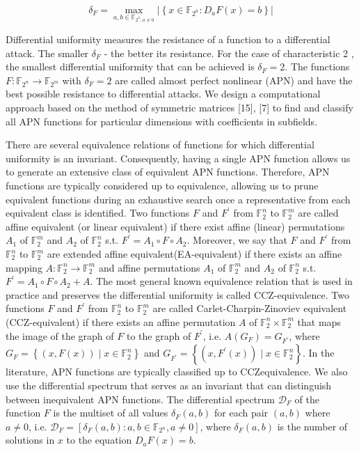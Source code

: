 \documentclass[10pt]{article}
\begin{document}
$$
\delta_{F}=\max _{a, b \in \mathbb{F}_{2^{n}, a \neq 0}}\left|\left\{x \in \mathbb{F}_{2^{n}}: D_{a} F(x)=b\right\}\right|
$$

Differential uniformity measures the resistance of a function to a differential attack. The smaller $\delta_{F}$ - the better its resistance. For the case of characteristic 2 , the smallest differential uniformity that can be achieved is $\delta_{F}=2$. The functions $F: \mathbb{F}_{2^{n}} \rightarrow \mathbb{F}_{2^{m}}$ with $\delta_{F}=2$ are called almost perfect nonlinear (APN) and have the best possible resistance to differential attacks. We design a computational approach based on the method of symmetric matrices [15], [7] to find and classify all APN functions for particular dimensions with coefficients in subfields.

There are several equivalence relations of functions for which differential uniformity is an invariant. Consequently, having a single APN function allows us to generate an extensive class of equivalent APN functions. Therefore, APN functions are typically considered up to equivalence, allowing us to prune equivalent functions during an exhaustive search once a representative from each equivalent class is identified. Two functions $F$ and $F^{\prime}$ from $\mathbb{F}_{2}^{n}$ to $\mathbb{F}_{2}^{m}$ are called affine equivalent (or linear equivalent) if there exist affine (linear) permutations $A_{1}$ of $\mathbb{F}_{2}^{m}$ and $A_{2}$ of $\mathbb{F}_{2}^{n}$ s.t. $F^{\prime}=A_{1} \circ F \circ A_{2}$. Moreover, we say that $F$ and $F^{\prime}$ from $\mathbb{F}_{2}^{n}$ to $\mathbb{F}_{2}^{m}$ are extended affine equivalent(EA-equivalent) if there exists an affine mapping $A: \mathbb{F}_{2}^{n} \rightarrow \mathbb{F}_{2}^{m}$ and affine permutations $A_{1}$ of $\mathbb{F}_{2}^{m}$ and $A_{2}$ of $\mathbb{F}_{2}^{n}$ s.t. $F^{\prime}=A_{1} \circ F \circ A_{2}+A$. The most general known equivalence relation that is used in practice and preserves the differential uniformity is called CCZ-equivalence. Two functions $F$ and $F^{\prime}$ from $\mathbb{F}_{2}^{n}$ to $\mathbb{F}_{2}^{m}$ are called Carlet-Charpin-Zinoviev equivalent (CCZ-equivalent) if there exists an affine permutation $A$ of $\mathbb{F}_{2}^{n} \times \mathbb{F}_{2}^{m}$ that maps the image of the graph of $F$ to the graph of $F^{\prime}$, i.e. $A\left(G_{F}\right)=G_{F^{\prime}}$, where $G_{F}=\left\{(x, F(x)) \mid x \in \mathbb{F}_{2}^{n}\right\}$ and $G_{F^{\prime}}=\left\{\left(x, F^{\prime}(x)\right) \mid x \in \mathbb{F}_{2}^{n}\right\}$. In the literature, APN functions are typically classified up to CCZequivalence. We also use the differential spectrum that serves as an invariant that can distinguish between inequivalent APN functions. The differential spectrum $\mathcal{D}_{F}$ of the function $F$ is the multiset of all values $\delta_{F}(a, b)$ for each pair $(a, b)$ where $a \neq 0$, i.e. $\mathcal{D}_{F}=\left[\delta_{F}(a, b): a, b \in \mathbb{F}_{2^{n}}, a \neq 0\right]$, where $\delta_{F}(a, b)$ is the number of solutions in $x$ to the equation $D_{a} F(x)=b$.
\end{document}
